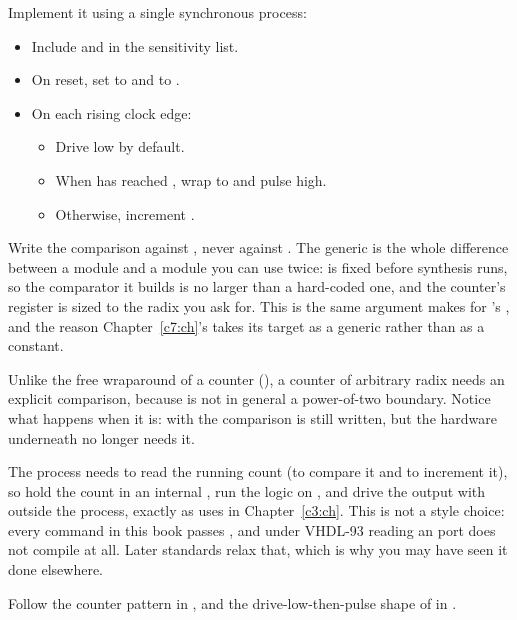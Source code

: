 \noindent Implement it using a single synchronous process:
\begin{itemize}
  \item Include  and  in the sensitivity list.
  \item On reset, set  to  and  to .
  \item On each rising clock edge:
    \begin{itemize}
      \item Drive  low by default.
      \item When  has reached , wrap  to  and pulse
         high.
      \item Otherwise, increment .
    \end{itemize}
\end{itemize}
Write the comparison against , never against . The generic is the whole
difference between a module and a module you can use twice:  is fixed before synthesis
runs, so the comparator it builds is no larger than a hard-coded one, and the counter's register is
sized to the radix you ask for. This is the same argument  makes for
's , and the reason Chapter~\ref{c7:ch}'s  takes its
target as a generic rather than as a constant.

Unlike the free wraparound of a  counter (), a counter of
arbitrary radix needs an explicit comparison, because  is not in general a
power-of-two boundary. Notice what happens when it is: with  the comparison is
still written, but the hardware underneath no longer needs it.

\note[Tip] The process needs to read the running count (to compare it and to increment it), so hold
the count in an internal , run the logic on
, and drive the output with  outside the process, exactly as
 uses  in Chapter~\ref{c3:ch}. This is not a style choice: every
 command in this book passes , and under VHDL-93 reading an 
port does not compile at all. Later standards relax that, which is why you may have seen it done
elsewhere.

Follow the counter pattern in , and the drive-low-then-pulse shape of
 in .

